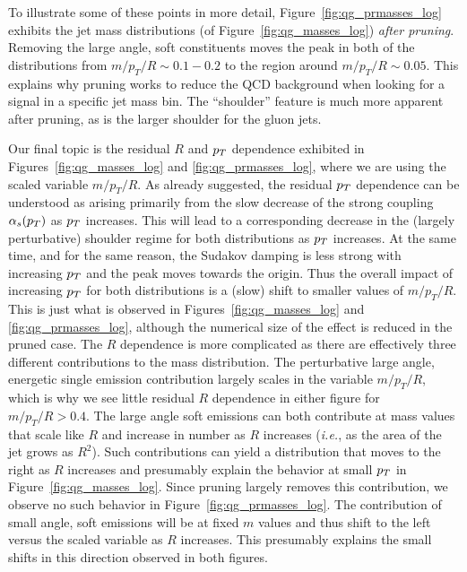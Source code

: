 To illustrate some of these points in more detail, Figure~\ref{fig:qg_prmasses_log} exhibits the jet mass distributions (of  Figure~\ref{fig:qg_masses_log}) 
\textit{after pruning}\cite{Ellis:2009me,Ellis:2009su}.  Removing the large angle,  soft constituents
moves the peak in both of the distributions from  $m/p_T/R \sim 0.1 - 0.2$ to the region around $m/p_T/R \sim 0.05$.  This explains why pruning works to reduce the
QCD background when looking for a signal in a specific jet mass bin.  The ``shoulder'' feature is much more apparent after pruning, as is the larger shoulder for
the gluon jets.  

Our final topic is the residual $R$ and $p_T$ dependence exhibited in Figures~\ref{fig:qg_masses_log} and \ref{fig:qg_prmasses_log}, where we are
using the scaled variable $m/p_T/R$.  As already suggested, the residual $p_T$ dependence can be understood as arising primarily from the slow decrease of the strong
coupling $\alpha_s(p_T)$ as $p_T$ increases.  This will lead to a corresponding decrease in the (largely perturbative) shoulder regime for both distributions
as $p_T$ increases.  At the same time, and for the same reason, the Sudakov damping is less strong with increasing $p_T$ and the peak moves towards the origin.
Thus the overall impact of increasing $p_T$ for both distributions is a (slow) shift to smaller values of $m/p_T/R$.  This is just what is observed in 
Figures~\ref{fig:qg_masses_log} and \ref{fig:qg_prmasses_log}, although the numerical size of the effect is reduced in the pruned case.
The $R$ dependence is more complicated as there are effectively three different contributions to the mass distribution.  
The perturbative large angle, energetic single emission contribution
largely scales in the variable $m/p_T/R$, which is why we see little residual $R$ dependence in either figure for $m/p_T/R > 0.4$.  
The large angle soft emissions can both contribute
at mass values that scale like $R$ and increase in number as $R$ increases (\textit{i.e.}, as the area of the jet grows as $R^2$).  Such contributions can yield
a distribution that moves to the right as $R$ increases and presumably explain the behavior at small $p_T$ in Figure~\ref{fig:qg_masses_log}.  Since pruning
largely removes this contribution, we observe no such behavior in Figure~\ref{fig:qg_prmasses_log}.  The contribution of small angle, soft emissions will be at
fixed $m$ values and thus shift to the left versus the scaled variable as $R$ increases.  
This presumably explains the small shifts in this direction observed in both figures.

